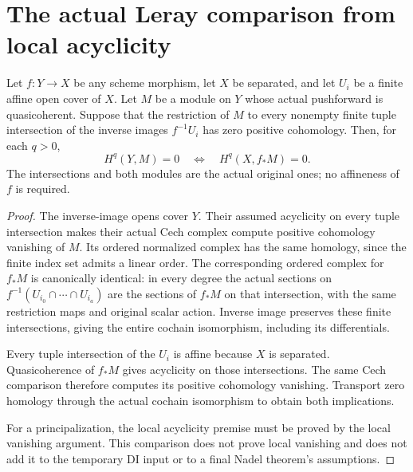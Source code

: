 \section{The actual Leray comparison from local acyclicity}
\label{sec:kn-nadel-leray-cech}

\begin{lemma}
\label{lem:kn-nadel-leray-acyclic-intersections}
\leanok
Let $f:Y\to X$ be any scheme morphism, let $X$ be separated, and let
$U_i$ be a finite affine open cover of $X$.  Let $M$ be a module on $Y$
whose actual pushforward is quasicoherent.  Suppose that the restriction
of $M$ to every nonempty finite tuple intersection of the inverse images
$f^{-1}U_i$ has zero positive cohomology.  Then, for each $q>0$,
\[
 H^q(Y,M)=0\quad\Longleftrightarrow\quad H^q(X,f_*M)=0.
\]
The intersections and both modules are the actual original ones; no
affineness of $f$ is required.
\end{lemma}
\begin{proof}
The inverse-image opens cover $Y$.  Their assumed acyclicity on every
tuple intersection makes their actual Cech complex compute positive
cohomology vanishing of $M$.  Its ordered normalized complex has the
same homology, since the finite index set admits a linear order.
The corresponding ordered complex for $f_*M$ is canonically identical:
in every degree the actual sections on $f^{-1}(U_{i_0}\cap\cdots\cap
U_{i_a})$ are the sections of $f_*M$ on that intersection, with the
same restriction maps and original scalar action.  Inverse image
preserves these finite intersections, giving the entire cochain
isomorphism, including its differentials.

Every tuple intersection of the $U_i$ is affine because $X$ is separated.
Quasicoherence of $f_*M$ gives acyclicity on those intersections.
The same Cech comparison therefore computes its positive cohomology
vanishing.  Transport zero homology through the actual cochain
isomorphism to obtain both implications.

For a principalization, the local acyclicity premise must be proved by
the local vanishing argument.  This comparison does not prove local
vanishing and does not add it to the temporary DI input or to a final
Nadel theorem's assumptions.
\end{proof}
